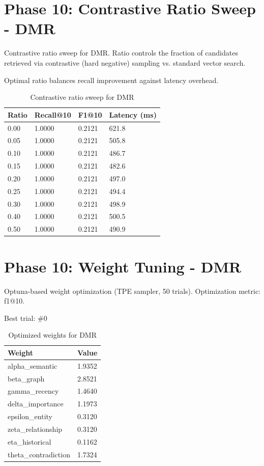 \documentclass[11pt]{article}
\begin{document}
\section{Phase 10: Contrastive Ratio Sweep - DMR}
Contrastive ratio sweep for DMR. Ratio controls the fraction of candidates retrieved via contrastive (hard negative) sampling vs. standard vector search.

Optimal ratio balances recall improvement against latency overhead.

\begin{table}[htbp]
\centering
\begin{tabular}{llll}
\toprule
Ratio & Recall@10 & F1@10 & Latency (ms) \\
\midrule
0.00 & 1.0000 & 0.2121 & 621.8 \\
0.05 & 1.0000 & 0.2121 & 505.8 \\
0.10 & 1.0000 & 0.2121 & 486.7 \\
0.15 & 1.0000 & 0.2121 & 482.6 \\
0.20 & 1.0000 & 0.2121 & 497.0 \\
0.25 & 1.0000 & 0.2121 & 494.4 \\
0.30 & 1.0000 & 0.2121 & 498.9 \\
0.40 & 1.0000 & 0.2121 & 500.5 \\
0.50 & 1.0000 & 0.2121 & 490.9 \\
\bottomrule
\end{tabular}
\caption{Contrastive ratio sweep for DMR}
\end{table}

\section{Phase 10: Weight Tuning - DMR}
Optuna-based weight optimization (TPE sampler, 50 trials). Optimization metric: f1@10.

Best trial: \#0

\begin{table}[htbp]
\centering
\begin{tabular}{ll}
\toprule
Weight & Value \\
\midrule
alpha\_semantic & 1.9352 \\
beta\_graph & 2.8521 \\
gamma\_recency & 1.4640 \\
delta\_importance & 1.1973 \\
epsilon\_entity & 0.3120 \\
zeta\_relationship & 0.3120 \\
eta\_historical & 0.1162 \\
theta\_contradiction & 1.7324 \\
\bottomrule
\end{tabular}
\caption{Optimized weights for DMR}
\end{table}
\end{document}
